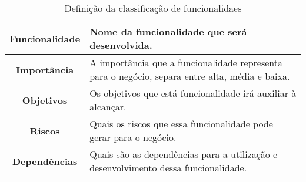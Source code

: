       \begin{table}[h!]
        \centering
        \begin{tabular}{|c|p{10cm}|}
          \hline
          \textbf{Funcionalidade} &
          Nome da funcionalidade que será desenvolvida. \\ \hline
          \textbf{Importância} &
          A importância que a funcionalidade representa para o negócio, separa entre
          alta, média e baixa. \\ \hline
          \textbf{Objetivos} &
          Os objetivos que está funcionalidade irá auxiliar à alcançar. \\ \hline
          \textbf{Riscos} &
          Quais os riscos que essa funcionalidade pode gerar para o negócio. \\ \hline
          \textbf{Dependências} &
          Quais são as dependências para a utilização e desenvolvimento dessa
          funcionalidade. \\ \hline
        \end{tabular}
        \caption{Definição da classificação de funcionalidaes}
        \label{Tabela:1}
      \end{table}

